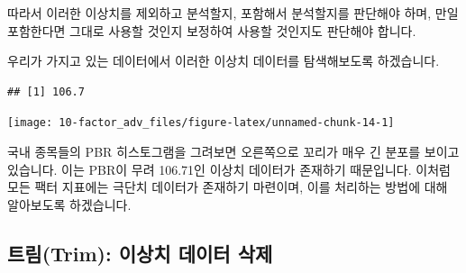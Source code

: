 \documentclass[12pt,]{book}
\newenvironment{Shaded}{\begin{snugshade}}{\end{snugshade}}
\newcommand{\DataTypeTok}[1]{\textcolor[rgb]{0.13,0.29,0.53}{#1}}
\newcommand{\DecValTok}[1]{\textcolor[rgb]{0.00,0.00,0.81}{#1}}
\newcommand{\FloatTok}[1]{\textcolor[rgb]{0.00,0.00,0.81}{#1}}
\newcommand{\KeywordTok}[1]{\textcolor[rgb]{0.13,0.29,0.53}{\textbf{#1}}}
\newcommand{\NormalTok}[1]{#1}
\newcommand{\OperatorTok}[1]{\textcolor[rgb]{0.81,0.36,0.00}{\textbf{#1}}}
\newcommand{\OtherTok}[1]{\textcolor[rgb]{0.56,0.35,0.01}{#1}}
\newcommand{\StringTok}[1]{\textcolor[rgb]{0.31,0.60,0.02}{#1}}
\begin{document}
따라서 이러한 이상치를 제외하고 분석할지, 포함해서 분석할지를 판단해야 하며, 만일 포함한다면 그대로 사용할 것인지 보정하여 사용할 것인지도 판단해야 합니다.

우리가 가지고 있는 데이터에서 이러한 이상치 데이터를 탐색해보도록 하겠습니다.

\begin{Shaded}
\end{Shaded}

\begin{verbatim}
## [1] 106.7
\end{verbatim}

\begin{Shaded}
\end{Shaded}

\begin{center}\texttt{[image: 10-factor\_adv\_files/figure-latex/unnamed-chunk-14-1]} \end{center}

국내 종목들의 PBR 히스토그램을 그려보면 오른쪽으로 꼬리가 매우 긴 분포를 보이고 있습니다. 이는 PBR이 무려 106.71인 이상치 데이터가 존재하기 때문입니다. 이처럼 모든 팩터 지표에는 극단치 데이터가 존재하기 마련이며, 이를 처리하는 방법에 대해 알아보도록 하겠습니다.

\hypertarget{trim---}{%
\subsection{트림(Trim): 이상치 데이터 삭제}\label{trim---}}
\end{document}
